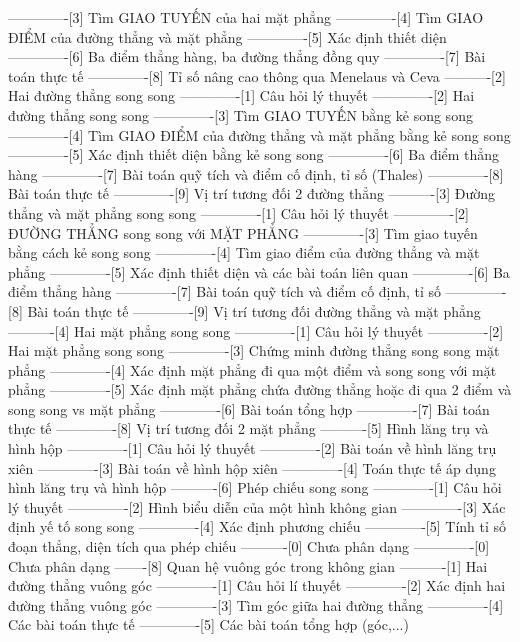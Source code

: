 -------------[3] Tìm GIAO TUYẾN của hai mặt phẳng
-------------[4] Tìm GIAO ĐIỂM của đường thẳng và mặt phẳng
-------------[5] Xác định thiết diện
-------------[6] Ba điểm thẳng hàng, ba đường thẳng đồng quy
-------------[7] Bài toán thực tế
-------------[8] Tỉ số nâng cao thông qua Menelaus và Ceva
----------[2] Hai đường thẳng song song
-------------[1] Câu hỏi lý thuyết
-------------[2] Hai đường thẳng song song
-------------[3] Tìm GIAO TUYẾN bằng kẻ song song
-------------[4] Tìm GIAO ĐIỂM của đường thẳng và mặt phẳng bằng kẻ song song
-------------[5] Xác định thiết diện bằng kẻ song song
-------------[6] Ba điểm thẳng hàng
-------------[7] Bài toán quỹ tích và điểm cố định, tỉ số (Thales)
-------------[8] Bài toán thực tế
-------------[9] Vị trí tương đối 2 đường thẳng
----------[3] Đường thẳng và mặt phẳng song song
-------------[1] Câu hỏi lý thuyết
-------------[2] ĐƯỜNG THẲNG song song với MẶT PHẲNG
-------------[3] Tìm giao tuyến bằng cách kẻ song song
-------------[4] Tìm giao điểm của đường thẳng và mặt phẳng
-------------[5] Xác định thiết diện và các bài toán liên quan
-------------[6] Ba điểm thẳng hàng
-------------[7] Bài toán quỹ tích và điểm cố định, tỉ số
-------------[8] Bài toán thực tế
-------------[9] Vị trí tương đối đường thẳng và mặt phẳng
----------[4] Hai mặt phẳng song song
-------------[1] Câu hỏi lý thuyết
-------------[2] Hai mặt phẳng song song
-------------[3] Chứng minh đường thẳng song song mặt phẳng
-------------[4] Xác định mặt phẳng đi qua một điểm và song song với mặt phẳng
-------------[5] Xác định mặt phẳng chứa đường thẳng hoặc đi qua 2 điểm và song song vs mặt phẳng
-------------[6] Bài toán tổng hợp
-------------[7] Bài toán thực tế
-------------[8] Vị trí tương đối 2 mặt phẳng
----------[5] Hình lăng trụ và hình hộp
-------------[1] Câu hỏi lý thuyết
-------------[2] Bài toán về hình lăng trụ xiên
-------------[3] Bài toán về hình hộp xiên
-------------[4] Toán thực tế áp dụng hình lăng trụ và hình hộp
----------[6] Phép chiếu song song
-------------[1] Câu hỏi lý thuyết
-------------[2] Hình biểu diễn của một hình không gian
-------------[3] Xác định yế tố song song
-------------[4] Xác định phương chiếu
-------------[5] Tính tỉ số đoạn thẳng, diện tích qua phép chiếu
----------[0] Chưa phân dạng
-------------[0] Chưa phân dạng
-------[8] Quan hệ vuông góc trong không gian
----------[1] Hai đường thẳng vuông góc
-------------[1] Câu hỏi lí thuyết
-------------[2] Xác định hai đường thẳng vuông góc
-------------[3] Tìm góc giữa hai đường thẳng
-------------[4] Các bài toán thực tế
-------------[5] Các bài toán tổng hợp  (góc,...)
